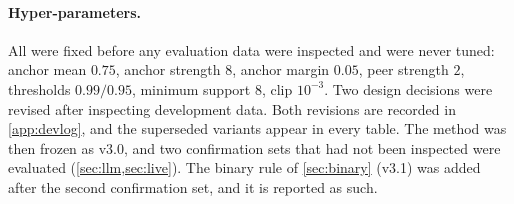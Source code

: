 \paragraph{Hyper-parameters.} All were fixed before any evaluation data were inspected and were never tuned: anchor mean $0.75$, anchor strength $8$, anchor margin $0.05$, peer strength $2$, thresholds $0.99/0.95$, minimum support $8$, clip $10^{-3}$. Two design decisions were revised after inspecting development data. Both revisions are recorded in \cref{app:devlog}, and the superseded variants appear in every table. The method was then frozen as v3.0, and two confirmation sets that had not been inspected were evaluated (\cref{sec:llm,sec:live}). The binary rule of \cref{sec:binary} (v3.1) was added after the second confirmation set, and it is reported as such.
